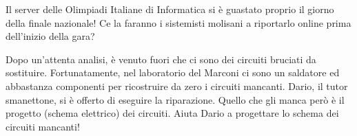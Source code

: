 \usepackage{xcolor}
\usepackage{afterpage}
\usepackage{float}
\usepackage{caption}
\usepackage{tabularx}
\usepackage{pifont,mdframed}
\usepackage[bottom]{footmisc}
\usepackage{listings}
\usepackage{multicol}

\lstset{
	columns=flexible,
	basicstyle=\small\ttfamily,
	mathescape=true,
	escapeinside=||
}


\renewcommand{\inputfile}{\texttt{stdin}}
\renewcommand{\outputfile}{\texttt{stdout}}
\makeatletter
\renewcommand{\this@inputfilename}{\texttt{input}}
\renewcommand{\this@outputfilename}{\texttt{output}}
\makeatother

\newenvironment{warning}
  {\par\begin{mdframed}[linewidth=2pt,linecolor=gray]%
    \begin{list}{}{\leftmargin=1cm
                   \labelwidth=\leftmargin}\item[\Large\ding{43}]}
  {\end{list}\end{mdframed}\par}
\newenvironment{danger}
{\par\begin{mdframed}[linewidth=2pt,linecolor=red!60!yellow,backgroundcolor=red!20!white]%
		\begin{list}{}{\leftmargin=1cm
				\labelwidth=\leftmargin}\item[\Large\ding{45}]}
		{\end{list}\end{mdframed}\par}


Il server delle Olimpiadi Italiane di Informatica si è guastato proprio il
giorno della finale nazionale! Ce la faranno i sistemisti molisani a riportarlo
online prima dell'inizio della gara?

Dopo un'attenta analisi, è venuto fuori che ci sono dei circuiti bruciati da sostituire.
Fortunatamente, nel laboratorio del Marconi ci sono un saldatore ed
abbastanza componenti per ricostruire da zero i circuiti mancanti.
Dario, il tutor smanettone, si è offerto di eseguire la riparazione.
Quello che gli manca però è il progetto (schema elettrico) dei circuiti.
Aiuta Dario a progettare lo schema dei circuiti mancanti!

